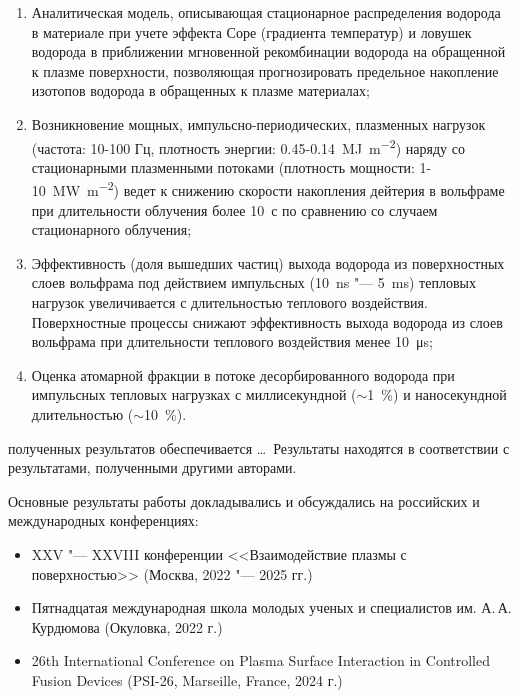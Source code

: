 {}
\begin{enumerate}[beginpenalty=10000] %
  \item Аналитическая модель, описывающая стационарное распределения водорода в материале при учете эффекта Соре (градиента температур) 
  и ловушек водорода в приближении мгновенной рекомбинации водорода на обращенной к плазме поверхности, позволяющая прогнозировать предельное 
  накопление изотопов водорода в обращенных к плазме материалах;
  \item Возникновение мощных, импульсно-периодических, плазменных нагрузок (частота: 10-100 Гц, плотность энергии: 0.45-\SI{0.14}{\mega\joule\per\meter\squared}) 
  наряду со стационарными плазменными потоками (плотность мощности: 1-\SI{10}{\mega\watt\per\meter\squared}) ведет к снижению скорости накопления дейтерия в 
  вольфраме при длительности облучения более \SI{10}{с} по сравнению со случаем стационарного облучения; 
  \item Эффективность (доля вышедших частиц) выхода водорода из поверхностных слоев вольфрама под действием импульсных 
  (\SI{10}{\nano\second} "--- \SI{5}{\milli\second}) тепловых нагрузок увеличивается с длительностью теплового воздействия. Поверхностные процессы снижают эффективность 
  выхода водорода из слоев вольфрама при длительности теплового воздействия менее \SI{10}{\micro\second};
  \item Оценка атомарной фракции в потоке десорбированного водорода при импульсных 
  тепловых нагрузках с миллисекундной ($\sim$1~\%) и наносекундной длительностью ($\sim$10~\%).
\end{enumerate}

{\reliability} полученных результатов обеспечивается \ldots \ Результаты находятся в соответствии с результатами, полученными другими авторами.

{\probation}
Основные результаты работы докладывались и обсуждались на российских и международных конференциях:
\begin{itemize}
    \item XXV "--- XXVIII конференции <<Взаимодействие плазмы с поверхностью>> (Москва, 2022 "--- 2025 гг.)
    \item Пятнадцатая международная школа молодых ученых и специалистов им. А.\,А. Курдюмова (Окуловка, 2022 г.)
    \item 26th International Conference on Plasma Surface Interaction in Controlled Fusion Devices (PSI-26, Marseille, France, 2024 г.)
\end{itemize}

